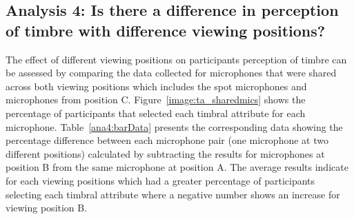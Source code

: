 















\subsection{Analysis 4: Is there a difference in perception of timbre with difference viewing positions?}
		
	The effect of different viewing positions on participants perception of timbre can be assessed by comparing the data collected for microphones that were shared across both viewing positions which includes the spot microphones and microphones from position C. Figure~\ref{image:ta_sharedmics} shows the percentage of participants that selected each timbral attribute for each microphone. Table~\ref{ana4:barData} presents the corresponding data showing the percentage difference between each microphone pair (one microphone at two different positions) calculated by subtracting the results for microphones at position B from the same microphone at position A. The average results indicate for each viewing positions which had a greater percentage of participants selecting each timbral attribute where a negative number shows an increase for viewing position B.


